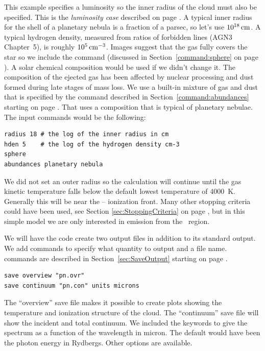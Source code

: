 \documentclass[12pt,twoside]{article}
\begin{document}
{This example specifies a luminosity so the inner radius of the cloud
must also be specified.
This is the \emph{luminosity case} described on
page \pageref{sec:LuminosityVsIntensityCases}.
A typical inner radius for the shell of a planetary nebula is a fraction
of a parsec, so let's use $10^{18} {\rm\thinspace cm}$.
A typical hydrogen density, measured
from ratios of forbidden lines (AGN3 Chapter~5),
is roughly $10^5 {\rm\thinspace cm^{-3}}$.
Images suggest that the gas fully covers the star so we include the
 command (discussed in Section~\ref{command:sphere}
on page \pageref{command:sphere}).
A solar chemical composition would be used if we didn't change it.
The composition of
the ejected gas has been affected by nuclear processing and
dust formed during late stages of mass loss.
We use a built-in mixture of gas and dust that is specified
by the  command
described in Section~\ref{command:abundances} starting
on page \pageref{command:abundances}.
That uses a composition that is typical of planetary nebulae.
The input commands would be the following:
\small
\begin{verbatim}
radius 18 # the log of the inner radius in cm
hden 5    # the log of the hydrogen density cm-3
sphere
abundances planetary nebula
\end{verbatim}
\normalsize
We did not set an outer radius so the calculation will continue until the
gas kinetic temperature falls below the default
lowest temperature of 4000~K.
Generally this will be near the \hplus -- \hO ionization front.
Many other stopping criteria
could have been used, see Section \ref{sec:StoppingCriteria}
on page \pageref{sec:StoppingCriteria}, but in
this simple model we are only interested in
emission from the \hplus\ region.

We will have the code create two output files in addition to its standard
output.
We add  commands to specify what quantity
to output and a file name.
 commands are described in Section~\ref{sec:SaveOutput}
starting on page \pageref{sec:SaveOutput}.
\small
\begin{verbatim}
save overview "pn.ovr"
save continuum "pn.con" units microns
\end{verbatim}
\normalsize
The ``overview'' save file makes it possible to create plots showing the
temperature and ionization structure of the cloud.  The ``continuum'' save
file will show the incident and total continuum.  We included the keywords
 to give the spectrum
as a function of the wavelength in
micron.
The default would have been the photon energy in Rydbergs.
Other options are available.

}
\end{document}

